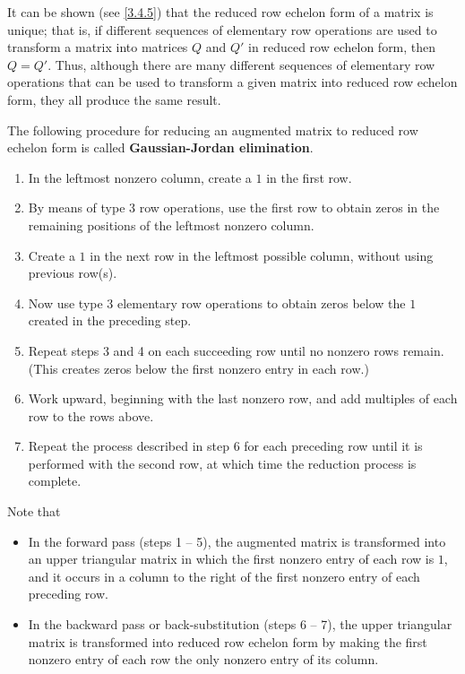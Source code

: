\begin{note}
  It can be shown (see \cref{3.4.5}) that the reduced row echelon form of a matrix is unique;
  that is, if different sequences of elementary row operations are used to transform a matrix into matrices \(Q\) and \(Q'\) in reduced row echelon form, then \(Q = Q'\).
  Thus, although there are many different sequences of elementary row operations that can be used to transform a given matrix into reduced row echelon form, they all produce the same result.
\end{note}

\begin{defn}\label{3.4.4}
  The following procedure for reducing an augmented matrix to reduced row echelon form is called \textbf{Gaussian-Jordan elimination}.
  \begin{enumerate}[label=\arabic*.]
    \item In the leftmost nonzero column, create a \(1\) in the first row.
    \item By means of type 3 row operations, use the first row to obtain zeros in the remaining positions of the leftmost nonzero column.
    \item Create a \(1\) in the next row in the leftmost possible column, without using previous row(s).
    \item Now use type 3 elementary row operations to obtain zeros below the \(1\) created in the preceding step.
    \item Repeat steps 3 and 4 on each succeeding row until no nonzero rows remain.
          (This creates zeros below the first nonzero entry in each row.)
    \item Work upward, beginning with the last nonzero row, and add multiples of each row to the rows above.
    \item Repeat the process described in step 6 for each preceding row until it is performed with the second row, at which time the reduction process is complete.
  \end{enumerate}
  Note that
  \begin{itemize}
    \item In the forward pass (steps 1 -- 5), the augmented matrix is transformed into an upper triangular matrix in which the first nonzero entry of each row is \(1\), and it occurs in a column to the right of the first nonzero entry of each preceding row.
    \item In the backward pass or back-substitution (steps 6 -- 7), the upper triangular matrix is transformed into reduced row echelon form by making the first nonzero entry of each row the only nonzero entry of its column.
  \end{itemize}
\end{defn}

